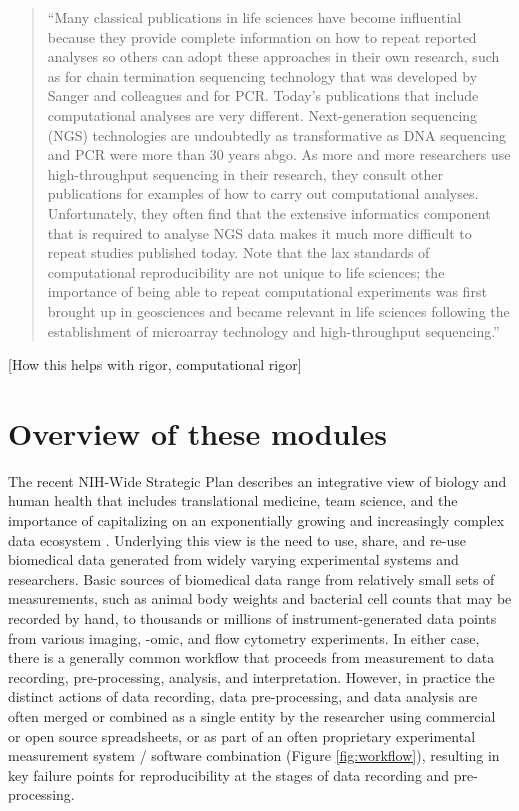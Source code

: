 \documentclass[]{tufte-book}
\begin{document}
\begin{quote}
``Many classical publications in life sciences have become influential because
they provide complete information on how to repeat reported analyses so others
can adopt these approaches in their own research, such as for chain termination
sequencing technology that was developed by Sanger and colleagues and for PCR.
Today's publications that include computational analyses are very different.
Next-generation sequencing (NGS) technologies are undoubtedly as transformative
as DNA sequencing and PCR were more than 30 years abgo. As more and more
researchers use high-throughput sequencing in their research, they consult other
publications for examples of how to carry out computational analyses.
Unfortunately, they often find that the extensive informatics component that is
required to analyse NGS data makes it much more difficult to repeat studies
published today. Note that the lax standards of computational reproducibility
are not unique to life sciences; the importance of being able to repeat
computational experiments was first brought up in geosciences and became
relevant in life sciences following the establishment of microarray technology
and high-throughput sequencing.'' \citep{nekrutenko2012next}
\end{quote}

{[}How this helps with rigor, computational rigor{]}

\section{Overview of these modules}\label{overview-of-these-modules}

The recent NIH-Wide Strategic Plan \citep{nih2016strategic}
describes an integrative view of biology and human health that includes
translational medicine, team science, and the importance of capitalizing on an
exponentially growing and increasingly complex data ecosystem \citep{nih2018data}.
Underlying this view is the need to use, share, and re-use biomedical data
generated from widely varying experimental systems and researchers. Basic
sources of biomedical data range from relatively small sets of measurements,
such as animal body weights and bacterial cell counts that may be recorded by
hand, to thousands or millions of instrument-generated data points from various
imaging, -omic, and flow cytometry experiments. In either case, there is a
generally common workflow that proceeds from measurement to data recording,
pre-processing, analysis, and interpretation. However, in practice the distinct
actions of data recording, data pre-processing, and data analysis are often
merged or combined as a single entity by the researcher using commercial or open
source spreadsheets, or as part of an often proprietary experimental measurement
system / software combination (Figure \ref{fig:workflow}), resulting in key
failure points for reproducibility at the stages of data recording and
pre-processing.
\end{document}
